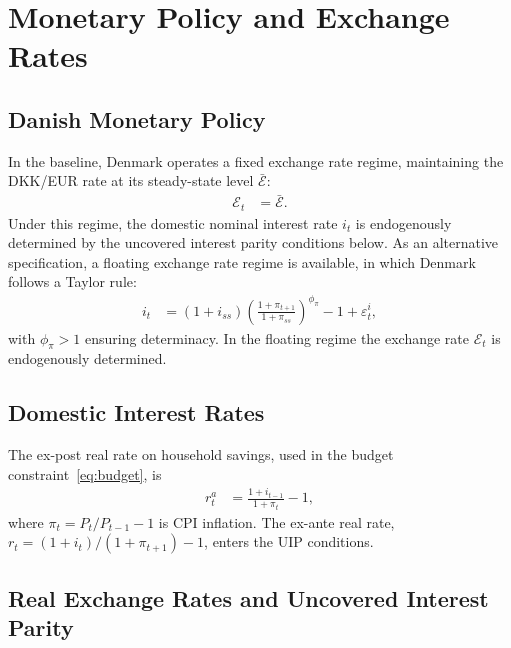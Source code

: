 \documentclass[12pt,a4paper]{article}
\begin{document}
\section{Monetary Policy and Exchange Rates}
\label{sec:monpol}

\subsection{Danish Monetary Policy}

In the baseline, Denmark operates a fixed exchange rate regime, maintaining the DKK/EUR rate at its steady-state level $\bar{\mathcal{E}}$:
\begin{align}
    \mathcal{E}_t &= \bar{\mathcal{E}}.
    \label{eq:fixed_ER}
\end{align}
Under this regime, the domestic nominal interest rate $i_t$ is endogenously determined by the uncovered interest parity conditions below. As an alternative specification, a floating exchange rate regime is available, in which Denmark follows a Taylor rule:
\begin{align}
    i_t &= (1+i_{ss})\left(\frac{1+\pi_{t+1}}{1+\pi_{ss}}\right)^{\!\phi_\pi} - 1 + \varepsilon^i_t,
    \label{eq:Taylor}
\end{align}
with $\phi_\pi > 1$ ensuring determinacy. In the floating regime the exchange rate $\mathcal{E}_t$ is endogenously determined.

\subsection{Domestic Interest Rates}

The ex-post real rate on household savings, used in the budget constraint~\eqref{eq:budget}, is
\begin{align}
    r^a_t &= \frac{1+i_{t-1}}{1+\pi_t} - 1,
    \label{eq:ra}
\end{align}
where $\pi_t = P_t/P_{t-1} - 1$ is CPI inflation. The ex-ante real rate, $r_t = (1+i_t)/(1+\pi_{t+1}) - 1$, enters the UIP conditions.

\subsection{Real Exchange Rates and Uncovered Interest Parity}
\end{document}
